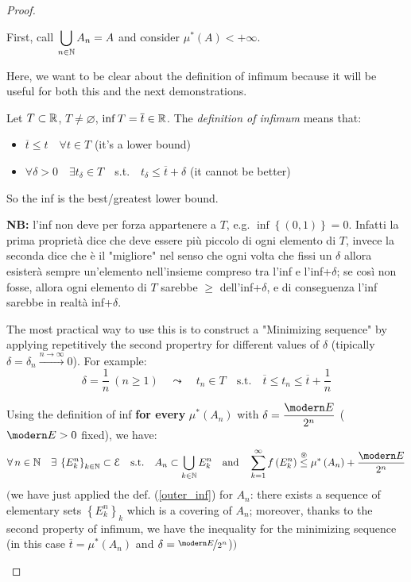 \begin{proof}
\begin{itemize}
    First, call $\displaystyle\bigcup_{n\in\mathbb{N}}A_n =A$ and consider $\mu^*(A)<+\infty$.

    \begin{marker}
    Here, we want to be clear about the definition of infimum because it will be useful for both this and the next demonstrations.

    \bigskip

    Let $T\subset\mathbb{R}$, $T\neq\varnothing$, $\inf T=\overline{t}\in\mathbb{R}$. The \emph{definition of infimum} means that:
    \begin{itemize}[$\triangleright$]
        \item $\overline{t}\leq t\quad\forall t\in T$ (it's a lower bound)
        \item $\forall\delta>0\quad \exists t_\delta\in T\quad$s.t.$\quad t_\delta\leq \overline{t}+\delta$ (it cannot be better)
    \end{itemize}
    So the inf is the best/greatest lower bound.

    \bigskip

    \textbf{NB:} l'inf non deve per forza appartenere a $T$, e.g. $\inf\left\{ (0,1) \right\}=0$. Infatti la prima proprietà dice che deve essere più piccolo di ogni elemento di $T$, invece la seconda dice che è il "migliore" nel senso che ogni volta che fissi un $\delta$ allora esisterà sempre un'elemento nell'insieme compreso tra l'inf e l'inf+$\delta$; se così non fosse, allora ogni elemento di $T$ sarebbe $\geq$ dell'inf+$\delta$, e di conseguenza l'inf sarebbe in realtà inf+$\delta$.

    \bigskip

    The most practical way to use this is to construct a "Minimizing sequence" by applying repetitively the second propertry for different values of $\delta$ (tipically $\delta=\delta_n\xrightarrow{n\to\infty}0$). For example:
    \begin{equation*}
    \delta=\frac{1}{n}\ (n\geq 1)\quad\leadsto\quad t_n\in T\quad\text{s.t.}\quad \overline{t}\leq t_n\leq \overline{t}+\frac{1}{n} 
    \end{equation*}
    \end{marker}

    Using the definition of inf \textbf{for every} $\mu^*\left( A_n \right)$ with $\delta=\dfrac{\Ec}{2^n}$ ($\Ec>0$ fixed), we have:
    \begin{equation*}
    \forall n\in\NN\quad\exists\left\{ E_k^n \right\}_{k\in\NN}\subset\Eeu\quad\text{s.t.}\quad A_n\subset\bigcup_{k\in\NN}E_k^n\quad\text{and}\quad \sum_{k=1}^\infty f\left( E_k^n \right)\overset{\circledast}{\leq} \mu^*\left( A_n \right)+\dfrac{\Ec}{2^n}
    \end{equation*}
    $\big($we have just applied the def. (\ref{outer_inf}) for $A_n$: there exists a sequence of elementary sets $\left\{ E_k^n \right\}_{k}$ which is a covering of $A_n$; moreover, thanks to the second property of infimum, we have the inequality for the minimizing sequence (in this case $\overline{t}=\mu^*\left( A_n \right)$ and $\delta=\nicefrac{\Ec}{2^n}$)$\big)$


\end{itemize}
\end{proof}

